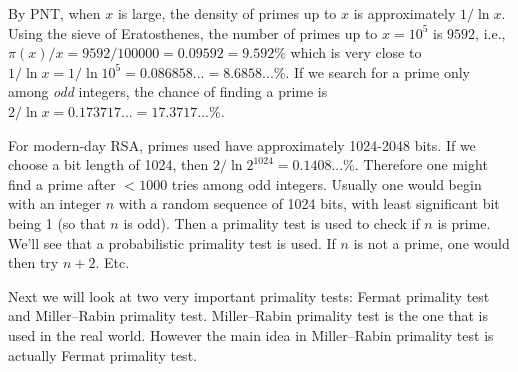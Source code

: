 By PNT, when $x$ is large, the density of primes up to $x$ is approximately
$1/\ln x$.
Using the sieve of Eratosthenes, the number of primes up to $x = 10^5$ is
$9592$, i.e., $\pi(x)/x = 9592/100000 = 0.09592 = 9.592\%$
which is very close to $1/\ln x = 1/\ln 10^5 = 0.086858... = 8.6858...\%$.
If we search for a prime only among \textit{odd} integers, the
chance of finding a prime is $2/\ln x = 0.173717... = 17.3717...\%$.

For modern-day RSA, primes used have approximately 1024-2048 bits.
If we choose a bit length of 1024, then
$2/\ln 2^{1024} = 0.1408...\%$.
Therefore one might find a prime after $< 1000$ tries among odd integers.
Usually one would begin with an integer $n$
with a random sequence of 1024 bits, with least
significant bit being 1 (so that $n$ is odd).
Then a primality test is used to check if $n$ is prime.
We'll see that a probabilistic primality test is used.
If $n$ is not a prime, one would then try $n + 2$. Etc.

Next we will look at two very important primality tests: Fermat primality test
and Miller--Rabin primality test.
Miller--Rabin primality test is the one that is used in the real world.
However the main idea in Miller--Rabin primality test is
actually Fermat primality test.






